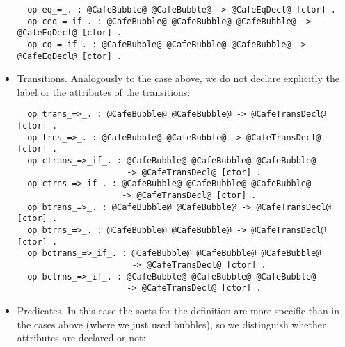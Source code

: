 \begin{itemize}
{\codesize
\begin{verbatim}
  op eq_=_. : @CafeBubble@ @CafeBubble@ -> @CafeEqDecl@ [ctor] .
  op ceq_=_if_. : @CafeBubble@ @CafeBubble@ @CafeBubble@ -> @CafeEqDecl@ [ctor] .
  op cq_=_if_. : @CafeBubble@ @CafeBubble@ @CafeBubble@ -> @CafeEqDecl@ [ctor] .
\end{verbatim}
}

\item
Transitions. Analogously to the case above, we do not declare explicitly the label
or the attributes of the transitions:

{\codesize
\begin{verbatim}
  op trans_=>_. : @CafeBubble@ @CafeBubble@ -> @CafeTransDecl@ [ctor] .
  op trns_=>_. : @CafeBubble@ @CafeBubble@ -> @CafeTransDecl@ [ctor] .
  op ctrans_=>_if_. : @CafeBubble@ @CafeBubble@ @CafeBubble@
                      -> @CafeTransDecl@ [ctor] .
  op ctrns_=>_if_. : @CafeBubble@ @CafeBubble@ @CafeBubble@
                     -> @CafeTransDecl@ [ctor] .
  op btrans_=>_. : @CafeBubble@ @CafeBubble@ -> @CafeTransDecl@ [ctor] .
  op btrns_=>_. : @CafeBubble@ @CafeBubble@ -> @CafeTransDecl@ [ctor] .
  op bctrans_=>_if_. : @CafeBubble@ @CafeBubble@ @CafeBubble@
                       -> @CafeTransDecl@ [ctor] .
  op bctrns_=>_if_. : @CafeBubble@ @CafeBubble@ @CafeBubble@
                      -> @CafeTransDecl@ [ctor] .
\end{verbatim}
}

{\codesize
\begin{comment}
  *** Operator definitions
  op op_:`->_`{_`}. : @CafeToken@ @CafeType@ @CafeAttrList@ -> @CafeOpDecl@ [ctor] .
  op op_:_->_`{_`}. : @CafeToken@ @CafeTypeList@ @CafeSort@ @CafeAttrList@
                      -> @CafeOpDecl@ [ctor] .
  op op_:`->_. : @CafeToken@ @CafeType@ -> @CafeOpDecl@ [ctor] .
  op op_:_->_. : @CafeToken@ @CafeTypeList@ @CafeType@ -> @CafeOpDecl@ [ctor] .
  op ops_:`->_`{_`}. : @NeCafeTokenList@ @CafeType@ @CafeAttrList@ -> @CafeOpDecl@ [ctor] .
  op ops_:_->_`{_`}. : @NeCafeTokenList@ @CafeTypeList@ @CafeType@ @CafeAttrList@
                       -> @CafeOpDecl@ [ctor] .
  op ops_:`->_. : @NeCafeTokenList@ @CafeType@ -> @CafeOpDecl@ [ctor] .
  op ops_:_->_. : @NeCafeTokenList@ @CafeTypeList@ @CafeType@  -> @CafeOpDecl@ [ctor] .
\end{comment}
}

\item
Predicates. In this case the sorts for the definition are more specific than in the
cases above (where we just used bubbles), so we distinguish whether attributes are
declared or not:


\end{itemize}
